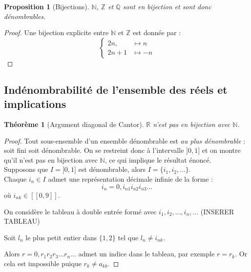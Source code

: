 \documentclass{article}
\theoremstyle{definition}
\theoremstyle{plain}
\newtheorem{proposition}[subsubsection]{Proposition}
\newtheorem{theorem}[subsubsection]{Théorème}
\theoremstyle{plain}
\theoremstyle{plain}
\theoremstyle{plain}
\begin{document}
\begin{proposition}[Bijections]
	\( \mathbb{N} \), \( \mathbb{Z} \) et \( \mathbb{Q} \) sont en bijection et sont donc dénombrables. \cite{tao2014analysis}
\end{proposition}
\begin{proof}
	Une bijection explicite entre \( \mathbb{N} \) et \( \mathbb{Z} \) est donnée par :
	\[
		\begin{cases}
			2n, & \mapsto n \\
			2n + 1 & \mapsto -n
		\end{cases}
	\]
\end{proof}

\subsection{Indénombrabilité de l'ensemble des réels et implications}

\begin{theorem}[Argument diagonal de Cantor]
	\( \mathbb{R} \) n'est pas en bijection avec \( \mathbb{N} \). \cite{aigner2018proofs} \cite{dehornoy2017théorie}
\end{theorem}
\begin{proof}
	Tout sous-ensemble d'un ensemble dénombrable est \textit{au plus dénombrable} : soit fini soit dénombrable. On se restreint donc à l'intervalle \( ]0,1] \) et on montre qu'il n'est pas en bijection avec \( \mathbb{N} \), ce qui implique le résultat énoncé. \\
	Supposons que \( I = ]0,1] \) est dénombrable, alors \( I = \{i_{1}, i_{2}, \ldots \} \). \\ 
	Chaque \( i_{n} \in I \) admet une représentation décimale infinie de la forme :
	\begin{equation*}
		i_{n} = 0,i_{n1}i_{n2}i_{n3}\ldots 
	\end{equation*}
	où \( i_{nk} \in [\![0,9]\!] \).

	On considère le tableau à double entrée formé avec \( i_{1}, i_{2}, \ldots, i_{n}, \ldots \) (INSERER TABLEAU)

	Soit \( l_{n} \) le plus petit entier dans \( \{1,2\}\) tel que \( l_{n} \neq i_{nk}\). 

	Alors \( r = 0,r_{1}r_{2}r_{3} \ldots r_{n}\ldots \) admet un indice dans le tableau, par exemple \( r = r_{k} \). Or cela est impossible puique \( r_{k} \neq a_{kk} \).
	
\end{proof}
\end{document}
